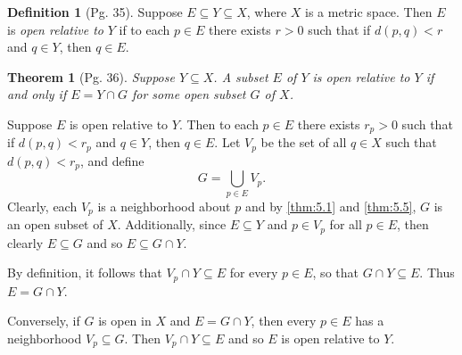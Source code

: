 \documentclass[leqno]{article}
\makeatletter
\newtheorem{theorem}{Theorem}[section]
\theoremstyle{definition}
\newtheorem{definition}{Definition}[section]
\theoremstyle{remark}
\let\oldproofname=\proofname
\renewcommand{\proofname}{\bf{\textit{\oldproofname}}}
\renewenvironment{proof}[1][\proofname]{\par
  \pushQED{\qed}%
  \normalfont \topsep6\p@\@plus6\p@\relax
  \list{}{\leftmargin=0mm
          \rightmargin=0mm
          \settowidth{\itemindent}{\itshape#1}%
          \labelwidth=4mm
          \parsep=0pt \listparindent=0mm%
  }
  \item[\hskip\labelsep
        \itshape
    #1\@addpunct{.}]\ignorespaces
}{%
  \popQED\endlist\@endpefalse
}
\makeatother
\begin{document}
            \begin{definition}[Pg. 35]\label{def:5.7}
                Suppose $E\subseteq Y\subseteq X$, where $X$ is a metric space. Then $E$ is \emph{open relative to} $Y$ if to each $p\in E$ there exists $r>0$ such that if $d(p,q)<r$ and $q\in Y$, then $q\in E$.
            \end{definition}
            \begin{theorem}[Pg. 36]\label{thm:5.8}
                Suppose $Y\subseteq X$. A subset $E$ of $Y$ is open relative to $Y$ if and only if $E=Y\cap G$ for some open subset $G$ of $X$. 
            \end{theorem}
                \begin{proof}
                    Suppose $E$ is open relative to $Y$. Then to each $p\in E$ there exists $r_p>0$ such that if $d(p,q)<r_p$ and $q\in Y$, then $q\in E$. Let $V_p$ be the set of all $q\in X$ such that $d(p,q)<r_p$, and define
                        \begin{equation*}
                            G=\bigcup_{p\in E}V_p.
                        \end{equation*}
                    Clearly, each $V_p$ is a neighborhood about $p$ and by \cref{thm:5.1} and \cref{thm:5.5}, $G$ is an open subset of $X$. Additionally, since $E\subseteq Y$ and $p\in V_p$ for all $p\in E$, then clearly $E\subseteq G$ and so $E\subseteq G\cap Y$.\par\hspace{4mm} By definition, it follows that $V_p\cap Y\subseteq E$ for every $p\in E$, so that $G\cap Y\subseteq E$. Thus $E=G\cap Y$.\par\hspace{4mm} Conversely, if $G$ is open in $X$ and $E=G\cap Y$, then every $p\in E$ has a neighborhood $V_p\subseteq G$. Then $V_p\cap Y\subseteq E$ and so $E$ is open relative to $Y$.
                \end{proof}
\end{document}
